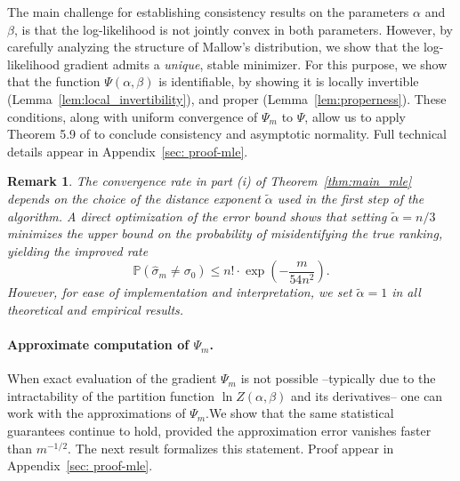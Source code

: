 \documentclass{article}
\newtheorem{remark}[theorem]{Remark} %
\begin{document}
The main challenge for establishing consistency results on the parameters \(\alpha\) and \(\beta\), is that the log-likelihood is not jointly convex in both parameters. However, by carefully analyzing the structure of Mallow's distribution, we show that the log-likelihood gradient admits a \emph{unique}, stable minimizer.
For this purpose, we show that the function $\Psi(\alpha, \beta)$ is identifiable, by showing it is locally invertible (Lemma~\ref{lem:local_invertibility}), and proper (Lemma~\ref{lem:properness}). These conditions, along with uniform convergence of $\Psi_m$ to $\Psi$, allow us to apply Theorem 5.9 of \cite{van2000asymptotic} to conclude consistency and asymptotic normality.
Full technical details appear in Appendix~\ref{sec: proof-mle}.

\begin{remark}
The convergence rate in part \textnormal{(i)} of Theorem~\ref{thm:main_mle} depends on the choice of the distance exponent \(\tilde\alpha\) used in the first step of the algorithm. A direct optimization of the error bound shows that setting \(\tilde\alpha = n/3\) minimizes the upper bound on the probability of misidentifying the true ranking, yielding the improved rate
\[
\mathbb{P}\left( \hat\sigma_m \ne \sigma_0 \right) \le n! \cdot \exp\left( -\frac{m}{54n^2} \right).
\]
However, for ease of implementation and interpretation, we set \(\tilde\alpha = 1\) in all theoretical and empirical results. 
\end{remark}

\paragraph{Approximate computation of \(\Psi_m\).}
When exact evaluation of the gradient  \(\Psi_m\) is not possible --typically due to the intractability of the partition function  \(\ln Z(\alpha, \beta)\) and its derivatives-- one can work with the approximations of  $\Psi_m$.We show that the same statistical guarantees continue to hold, provided the approximation error vanishes faster than \(m^{-1/2}\). The next result formalizes this statement. Proof appear in Appendix~\ref{sec: proof-mle}.
\end{document}
